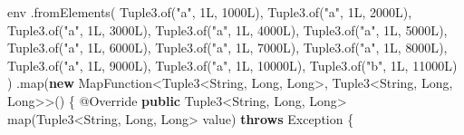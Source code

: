 \documentclass[cn,11pt,chinese]{elegantbook}
\newenvironment{Shaded}{}{}
\newcommand{\AttributeTok}[1]{\textcolor[rgb]{0.49,0.56,0.16}{#1}}
\newcommand{\BuiltInTok}[1]{#1}
\newcommand{\DecValTok}[1]{\textcolor[rgb]{0.25,0.63,0.44}{#1}}
\newcommand{\FunctionTok}[1]{\textcolor[rgb]{0.02,0.16,0.49}{#1}}
\newcommand{\KeywordTok}[1]{\textcolor[rgb]{0.00,0.44,0.13}{\textbf{#1}}}
\newcommand{\NormalTok}[1]{#1}
\newcommand{\StringTok}[1]{\textcolor[rgb]{0.25,0.44,0.63}{#1}}
\begin{document}
\begin{Shaded}
\begin{Highlighting}[]
\NormalTok{        env}
\NormalTok{            .}\FunctionTok{fromElements}\NormalTok{(}
\NormalTok{                Tuple3.}\FunctionTok{of}\NormalTok{(}\StringTok{"a"}\NormalTok{, }\DecValTok{1L}\NormalTok{, }\DecValTok{1000L}\NormalTok{),}
\NormalTok{                Tuple3.}\FunctionTok{of}\NormalTok{(}\StringTok{"a"}\NormalTok{, }\DecValTok{1L}\NormalTok{, }\DecValTok{2000L}\NormalTok{),}
\NormalTok{                Tuple3.}\FunctionTok{of}\NormalTok{(}\StringTok{"a"}\NormalTok{, }\DecValTok{1L}\NormalTok{, }\DecValTok{3000L}\NormalTok{),}
\NormalTok{                Tuple3.}\FunctionTok{of}\NormalTok{(}\StringTok{"a"}\NormalTok{, }\DecValTok{1L}\NormalTok{, }\DecValTok{4000L}\NormalTok{),}
\NormalTok{                Tuple3.}\FunctionTok{of}\NormalTok{(}\StringTok{"a"}\NormalTok{, }\DecValTok{1L}\NormalTok{, }\DecValTok{5000L}\NormalTok{),}
\NormalTok{                Tuple3.}\FunctionTok{of}\NormalTok{(}\StringTok{"a"}\NormalTok{, }\DecValTok{1L}\NormalTok{, }\DecValTok{6000L}\NormalTok{),}
\NormalTok{                Tuple3.}\FunctionTok{of}\NormalTok{(}\StringTok{"a"}\NormalTok{, }\DecValTok{1L}\NormalTok{, }\DecValTok{7000L}\NormalTok{),}
\NormalTok{                Tuple3.}\FunctionTok{of}\NormalTok{(}\StringTok{"a"}\NormalTok{, }\DecValTok{1L}\NormalTok{, }\DecValTok{8000L}\NormalTok{),}
\NormalTok{                Tuple3.}\FunctionTok{of}\NormalTok{(}\StringTok{"a"}\NormalTok{, }\DecValTok{1L}\NormalTok{, }\DecValTok{9000L}\NormalTok{),}
\NormalTok{                Tuple3.}\FunctionTok{of}\NormalTok{(}\StringTok{"a"}\NormalTok{, }\DecValTok{1L}\NormalTok{, }\DecValTok{10000L}\NormalTok{),}
\NormalTok{                Tuple3.}\FunctionTok{of}\NormalTok{(}\StringTok{"b"}\NormalTok{, }\DecValTok{1L}\NormalTok{, }\DecValTok{11000L}\NormalTok{)}
\NormalTok{            )}
\NormalTok{            .}\FunctionTok{map}\NormalTok{(}\KeywordTok{new}\NormalTok{ MapFunction\textless{}Tuple3\textless{}}\BuiltInTok{String}\NormalTok{, }\BuiltInTok{Long}\NormalTok{, }\BuiltInTok{Long}\NormalTok{\textgreater{}, Tuple3\textless{}}\BuiltInTok{String}\NormalTok{, }\BuiltInTok{Long}\NormalTok{, }\BuiltInTok{Long}\NormalTok{\textgreater{}\textgreater{}() \{}
                \AttributeTok{@Override}
                \KeywordTok{public}\NormalTok{ Tuple3\textless{}}\BuiltInTok{String}\NormalTok{, }\BuiltInTok{Long}\NormalTok{, }\BuiltInTok{Long}\NormalTok{\textgreater{} }\FunctionTok{map}\NormalTok{(Tuple3\textless{}}\BuiltInTok{String}\NormalTok{, }\BuiltInTok{Long}\NormalTok{, }\BuiltInTok{Long}\NormalTok{\textgreater{} value) }\KeywordTok{throws} \BuiltInTok{Exception}\NormalTok{ \{}

\end{Highlighting}
\end{Shaded}
\end{document}
